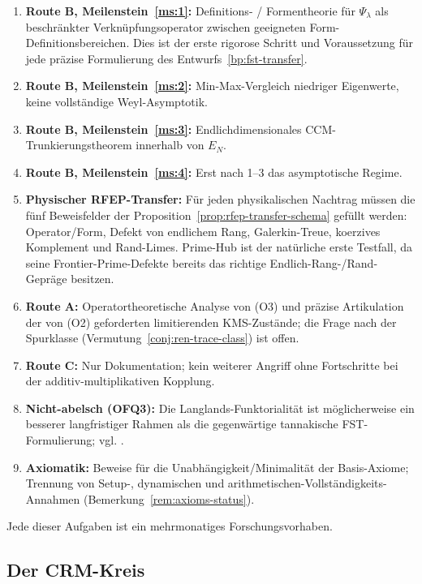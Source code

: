 \documentclass[11pt,a4paper]{article}
\theoremstyle{plain}
\theoremstyle{definition}
\begin{document}
\begin{enumerate}[leftmargin=*]
\item \textbf{Route B, Meilenstein~\ref{ms:1}:} Definitions- / Formentheorie für
  $\Psi_\lambda$ als beschränkter Verknüpfungsoperator zwischen geeigneten
  Form-Definitionsbereichen. Dies ist der erste rigorose Schritt und Voraussetzung
  für jede präzise Formulierung des Entwurfs~\ref{bp:fst-transfer}.
\item \textbf{Route B, Meilenstein~\ref{ms:2}:} Min-Max-Vergleich niedriger Eigenwerte,
  keine vollständige Weyl-Asymptotik.
\item \textbf{Route B, Meilenstein~\ref{ms:3}:} Endlichdimensionales CCM-Trunkierungstheorem
  innerhalb von $E_N$.
\item \textbf{Route B, Meilenstein~\ref{ms:4}:} Erst nach 1--3 das asymptotische Regime.
\item \textbf{Physischer RFEP-Transfer:} Für jeden physikalischen Nachtrag müssen
  die fünf Beweisfelder der Proposition~\ref{prop:rfep-transfer-schema} gefüllt werden:
  Operator/Form, Defekt von endlichem Rang, Galerkin-Treue, koerzives Komplement und Rand-Limes.
  Prime-Hub ist der natürliche erste Testfall, da seine Frontier-Prime-Defekte bereits
  das richtige Endlich-Rang-/Rand-Gepräge besitzen.
\item \textbf{Route A:} Operatortheoretische Analyse von (O3) und präzise Artikulation
  der von (O2) geforderten limitierenden KMS-Zustände; die Frage nach der Spurklasse
  (Vermutung~\ref{conj:ren-trace-class}) ist offen.
\item \textbf{Route C:} Nur Dokumentation; kein weiterer Angriff ohne Fortschritte
  bei der additiv-multiplikativen Kopplung.
\item \textbf{Nicht-abelsch (OFQ3):}  Die Langlands-Funktorialität ist möglicherweise
  ein besserer langfristiger Rahmen als die gegenwärtige tannakische FST-Formulierung;
  vgl. \cite{TannakianAxioms}.
\item \textbf{Axiomatik:} Beweise für die Unabhängigkeit/Minimalität der
  Basis-Axiome; Trennung von Setup-, dynamischen und
  arithmetischen-Vollständigkeits-Annahmen (Bemerkung~\ref{rem:axioms-status}).
\end{enumerate}

Jede dieser Aufgaben ist ein mehrmonatiges Forschungsvorhaben.

\subsection{Der CRM-Kreis}
\end{document}
